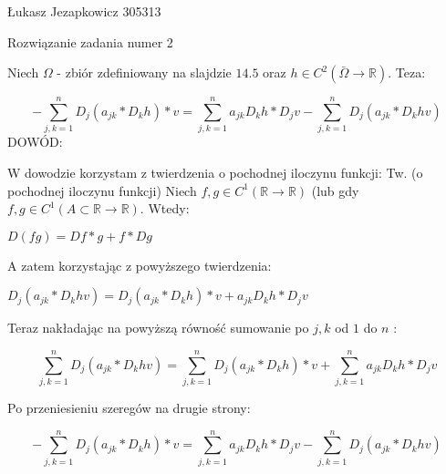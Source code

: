 \documentclass[12pt]{article}
\begin{document}
\begin{center}
\Large Łukasz Jezapkowicz 305313
\end{center}
\begin{center}
\Large Rozwiązanie zadania numer 2 
\end{center}
Niech $\Omega$ - zbiór zdefiniowany na slajdzie $14.5$ oraz $h\in{C}^2(\bar{\Omega}\to\mathbb{R})$. Teza:
\begin{center}
\Large $$-\sum_{j,k=1}^{n} D_j(a_{jk}*D_kh)*v = \sum_{j,k=1}^{n}a_{jk}D_kh*D_jv-\sum_{j,k=1}^{n}D_j(a_{jk}*D_khv)$$ \newline
DOWÓD:
\end{center} 
W dowodzie korzystam z twierdzenia o pochodnej iloczynu funkcji: \newline
Tw. (o pochodnej iloczynu funkcji) \newline
Niech $f,g\in{C}^1(\mathbb{R}\to\mathbb{R})$ (lub gdy $f,g\in{C}^1(A\subset\mathbb{R}\to\mathbb{R})$. Wtedy: \newline
\begin{center}
\Large $D(fg)=Df*g + f*Dg$
\end{center}
A zatem korzystając z powyższego twierdzenia: \newline
\begin{center}
\Large $D_j(a_{jk}*D_khv) = D_j(a_{jk}*D_kh)*v + a_{jk}D_kh*D_jv$
\end{center}
Teraz nakładając na powyższą równość sumowanie po $j,k$ od $1$ do $n$ :
\begin{center}
\Large $$\sum_{j,k=1}^{n}D_j(a_{jk}*D_khv) = \sum_{j,k=1}^{n} D_j(a_{jk}*D_kh)*v + \sum_{j,k=1}^{n}a_{jk}D_kh*D_jv$$
\end{center}
Po przeniesieniu szeregów na drugie strony:
\begin{center}
\Large $$-\sum_{j,k=1}^{n} D_j(a_{jk}*D_kh)*v = \sum_{j,k=1}^{n}a_{jk}D_kh*D_jv-\sum_{j,k=1}^{n}D_j(a_{jk}*D_khv)$$
\end{center}
\end{document}

